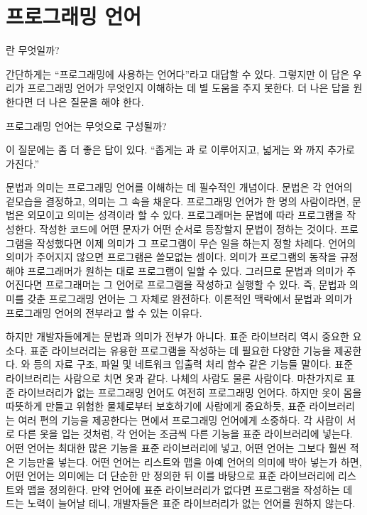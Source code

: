 \chapter{프로그래밍 언어}

란 무엇일까?

간단하게는 ``프로그래밍에 사용하는 언어다''라고 대답할 수 있다. 그렇지만 이 답은
우리가 프로그래밍 언어가 무엇인지 이해하는 데 별 도움을 주지 못한다. 더 나은
답을 원한다면 더 나은 질문을 해야 한다.

프로그래밍 언어는 무엇으로 구성될까?

이 질문에는 좀 더 좋은 답이 있다. ``좁게는 과
로 이루어지고, 넓게는 와 까지 추가로 가진다.''

문법과 의미는 프로그래밍 언어를 이해하는 데 필수적인 개념이다. 문법은 각 언어의
겉모습을 결정하고, 의미는 그 속을 채운다. 프로그래밍 언어가 한 명의 사람이라면,
문법은 외모이고 의미는 성격이라 할 수 있다. 프로그래머는 문법에 따라 프로그램을
작성한다. 작성한 코드에 어떤 문자가 어떤 순서로 등장할지 문법이 정하는 것이다.
프로그램을 작성했다면 이제 의미가 그 프로그램이 무슨 일을 하는지 정할 차례다.
언어의 의미가 주어지지 않으면 프로그램은 쓸모없는 셈이다. 의미가 프로그램의
동작을 규정해야 프로그래머가 원하는 대로 프로그램이 일할 수 있다. 그러므로
문법과 의미가 주어진다면 프로그래머는 그 언어로 프로그램을 작성하고 실행할 수
있다. 즉, 문법과 의미를 갖춘 프로그래밍 언어는 그 자체로 완전하다. 이론적인
맥락에서 문법과 의미가 프로그래밍 언어의 전부라고 할 수 있는 이유다.

하지만 개발자들에게는 문법과 의미가 전부가 아니다. 표준 라이브러리 역시 중요한
요소다. 표준 라이브러리는 유용한 프로그램을 작성하는 데 필요한 다양한 기능을
제공한다. 와  등의 자료 구조, 파일 및 네트워크 입출력 처리
함수 같은 기능들 말이다. 표준 라이브러리는 사람으로 치면 옷과 같다. 나체의
사람도 물론 사람이다. 마찬가지로 표준 라이브러리가 없는 프로그래밍 언어도 여전히
프로그래밍 언어다. 하지만 옷이 몸을 따뜻하게 만들고 위험한 물체로부터 보호하기에
사람에게 중요하듯, 표준 라이브러리는 여러 편의 기능을 제공한다는 면에서
프로그래밍 언어에게 소중하다. 각 사람이 서로 다른 옷을 입는 것처럼, 각 언어는
조금씩 다른 기능을 표준 라이브러리에 넣는다. 어떤 언어는 최대한 많은 기능을 표준
라이브러리에 넣고, 어떤 언어는 그보다 훨씬 적은 기능만을 넣는다. 어떤 언어는
리스트와 맵을 아예 언어의 의미에 박아 넣는가 하면, 어떤 언어는 의미에는 더
단순한 만 정의한 뒤 이를 바탕으로 표준 라이브러리에
리스트와 맵을 정의한다. 만약 언어에 표준 라이브러리가 없다면 프로그램을 작성하는
데 드는 노력이 늘어날 테니, 개발자들은 표준 라이브러리가 없는 언어를 원하지
않는다.

